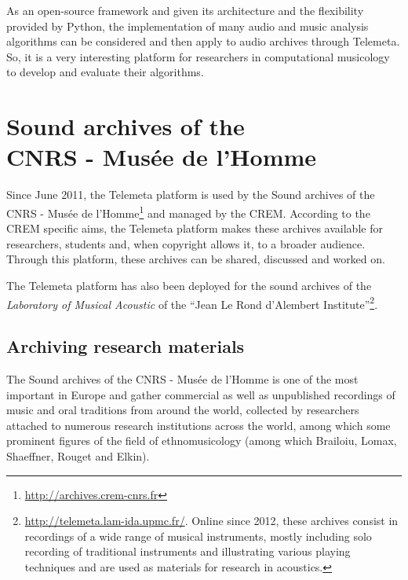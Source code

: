 \documentclass{sig-alternate}
\begin{document}
As an open-source framework and given its architecture and the flexibility provided by Python, the implementation of many audio and music analysis algorithms can be considered and then apply to audio archives through Telemeta. So, it is a very interesting platform for researchers in computational musicology to develop and evaluate their algorithms.


\section{Sound archives of the \\CNRS - Musée de l'Homme}\label{sec:archives-CREM}
Since June 2011, the Telemeta platform is used by the  Sound archives of the CNRS - Musée de l'Homme\footnote{\url{http://archives.crem-cnrs.fr}} and managed by the CREM. According to the CREM specific aims, the Telemeta platform makes these archives available for researchers, students and, when copyright allows it, to a broader audience. Through this platform, these archives can be shared, discussed and worked on.

The Telemeta platform has also been deployed for the sound archives of the \emph{Laboratory of Musical Acoustic} of the ``Jean Le Rond d'Alembert Institute''\footnote{\url{http://telemeta.lam-ida.upmc.fr/}. Online since 2012, these archives consist in recordings of a wide range of musical instruments, mostly including solo recording of traditional instruments and illustrating various playing techniques and are used as materials for research in acoustics.}.



\subsection{Archiving research materials}
The Sound archives of the CNRS - Musée de l'Homme is one of the most important in Europe and gather commercial as well as unpublished recordings of music and oral traditions from around the world, collected by researchers attached to numerous research institutions across the world, among which some prominent figures of the field of ethnomusicology (among which Brailoiu, Lomax, Shaeffner, Rouget and Elkin). 
\end{document}
